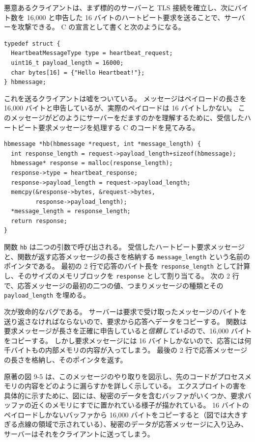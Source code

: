 \documentclass[uplatex]{jsarticle}
\def\label#1{}%
\begin{document}
悪意あるクライアントは、まず標的のサーバーと TLS 接続を確立し、次にバイト数を 16,000 と申告した 16 バイトのハートビート要求を送ることで、サーバーを攻撃できる。
C の宣言として書くと次のようになる。

\begin{verbatim}
typedef struct {
  HeartbeatMessageType type = heartbeat_request;
  uint16_t payload_length = 16000;
  char bytes[16] = {"Hello Heartbeat!"};
} hbmessage;
\end{verbatim}

これを送るクライアントは嘘をついている。
メッセージはペイロードの長さを 16,000 バイトと申告しているが、実際のペイロードは 16 バイトしかない。
このメッセージがどのようにサーバーをだますのかを理解するために、受信したハートビート要求メッセージを処理する C のコードを見てみる。

\begin{verbatim}
hbmessage *hb(hbmessage *request, int *message_length) {
  int response_length = request->payload_length+sizeof(hbmessage);
  hbmessage* response = malloc(response_length);
  response->type = heartbeat_response;
  response->payload_length = request->payload_length;
  memcpy(&response->bytes, &request->bytes,
         response->payload_length);
  *message_length = response_length;
  return response;
}
\end{verbatim}

関数 \texttt{hb} は二つの引数で呼び出される。
受信したハートビート要求メッセージと、関数が返す応答メッセージの長さを格納する \texttt{message\_length} という名前のポインタである。
最初の 2 行で応答のバイト長を \texttt{response\_length} として計算し、そのサイズのメモリブロックを \texttt{response} として割り当てる。
次の 2 行で、応答メッセージの最初の二つの値、つまりメッセージの種類とその \texttt{payload\_length} を埋める。

次が致命的なバグである。
サーバーは要求で受け取ったメッセージのバイトを送り返さなければならないので、要求から応答へデータをコピーする。
関数は要求メッセージが長さを正確に申告していると\emph{信頼している}ので、16,000 バイトをコピーする。
しかし要求メッセージには 16 バイトしかないので、応答には何千バイトもの内部メモリの内容が入ってしまう。
最後の 2 行で応答メッセージの長さを格納し、そのポインタを返す。

\begin{exa}\label{exa:ch9-heartbleed-exploit}
原著の図 9-5 は、このメッセージのやり取りを図示し、先のコードがプロセスメモリの内容をどのように漏らすかを詳しく示している。
エクスプロイトの害を具体的に示すために、図には、秘密のデータを含むバッファがいくつか、要求バッファの近くのメモリにすでに置かれている様子が描かれている。
16 バイトのペイロードしかないバッファから 16,000 バイトをコピーすると（図では大きすぎる点線の領域で示されている）、秘密のデータが応答メッセージに入り込み、サーバーはそれをクライアントに送ってしまう。
\end{exa}
\end{document}
